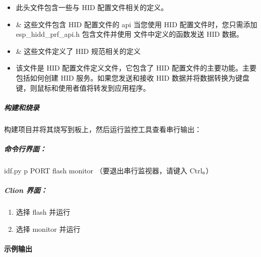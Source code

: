 \documentclass[a4paper,12pt,english]{sphinxmanual}
\begin{document}
{{\begin{itemize}
\item {} 
\sphinxAtStartPar
{} 此头文件包含一些与 HID 配置文件相关的定义。

\item {} 
\sphinxAtStartPar
{}\& 这些文件包含 HID 配置文件的 api 当您使用 HID 配置文件时，您只需添加 esp\_hidd\_prf\_api.h 包含文件并使用  文件中定义的函数发送 HID 数据。

\item {} 
\sphinxAtStartPar
{} \&  这些文件定义了 HID 规范相关的定义

\item {} 
\sphinxAtStartPar
{} 该文件是 HID 配置文件定义文件，它包含了 HID 配置文件的主要功能。主要包括如何创建 HID 服务。如果您发送和接收 HID 数据并将数据转换为键盘键，则鼠标和使用者值将转发到应用程序。

\end{itemize}


\subparagraph{构建和烧录}
\label{\detokenize{exp-esp32/bluetooth/hid-device-gatt:id5}}
\sphinxAtStartPar
构建项目并将其烧写到板上，然后运行监控工具查看串行输出：


\subparagraph{命令行界面：}
\label{\detokenize{exp-esp32/bluetooth/hid-device-gatt:id6}}
\sphinxAtStartPar
idf.py \sphinxhyphen{}p PORT flash monitor （要退出串行监视器，请键入 Ctrl\sphinxhyphen{}{]}。）


\subparagraph{Clion 界面：}
\label{\detokenize{exp-esp32/bluetooth/hid-device-gatt:clion}}\begin{enumerate}
%
\item {} 
\sphinxAtStartPar
选择 flash 并运行

\item {} 
\sphinxAtStartPar
选择 monitor 并运行

\end{enumerate}


\paragraph{示例输出}
\label{\detokenize{exp-esp32/bluetooth/hid-device-gatt:id7}}
\sphinxAtStartPar
{}

}}
\end{document}
